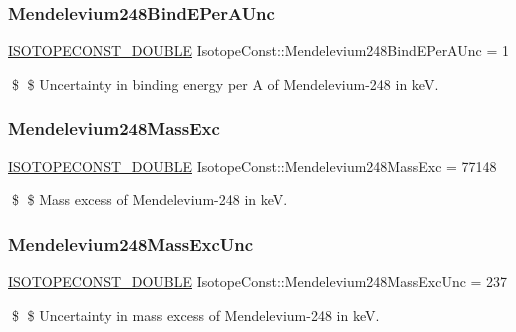 \subsubsection{\texorpdfstring{Mendelevium248\+Bind\+E\+Per\+A\+Unc}{Mendelevium248BindEPerAUnc}}
{\footnotesize\ttfamily \mbox{\hyperlink{group___isotope_const-_macros_ga8f45a7272ce02c0b4c65c44636ed719a}{I\+S\+O\+T\+O\+P\+E\+C\+O\+N\+S\+T\+\_\+\+D\+O\+U\+B\+LE}} Isotope\+Const\+::\+Mendelevium248\+Bind\+E\+Per\+A\+Unc = 1}

\$ \$ Uncertainty in binding energy per A of Mendelevium-\/248 in keV. \mbox{\label{group___isotope_const-_mendelevium-_md248_ga462abf6390c3e09677c3c838286ecb33}} 
\subsubsection{\texorpdfstring{Mendelevium248\+Mass\+Exc}{Mendelevium248MassExc}}
{\footnotesize\ttfamily \mbox{\hyperlink{group___isotope_const-_macros_ga8f45a7272ce02c0b4c65c44636ed719a}{I\+S\+O\+T\+O\+P\+E\+C\+O\+N\+S\+T\+\_\+\+D\+O\+U\+B\+LE}} Isotope\+Const\+::\+Mendelevium248\+Mass\+Exc = 77148}

\$ \$ Mass excess of Mendelevium-\/248 in keV. \mbox{\label{group___isotope_const-_mendelevium-_md248_ga03bac7e7a004833429e2746674523b47}} 
\subsubsection{\texorpdfstring{Mendelevium248\+Mass\+Exc\+Unc}{Mendelevium248MassExcUnc}}
{\footnotesize\ttfamily \mbox{\hyperlink{group___isotope_const-_macros_ga8f45a7272ce02c0b4c65c44636ed719a}{I\+S\+O\+T\+O\+P\+E\+C\+O\+N\+S\+T\+\_\+\+D\+O\+U\+B\+LE}} Isotope\+Const\+::\+Mendelevium248\+Mass\+Exc\+Unc = 237}

\$ \$ Uncertainty in mass excess of Mendelevium-\/248 in keV. \mbox{\label{group___isotope_const-_mendelevium-_md248_gab777f1768d57cc0372882613951317cf}} 
